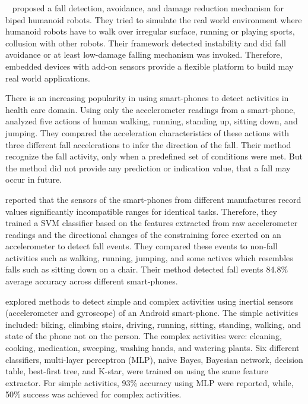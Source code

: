 \documentclass[letterpaper]{article}
\begin{document}
\begin{sloppy}
{~\cite{moya2014fall}} proposed a fall detection, avoidance, and damage 
reduction mechanism for biped humanoid robots. They tried to simulate the real world environment 
where humanoid robots have to walk over irregular surface, running or playing sports, collusion 
with other robots. Their framework detected instability and did fall avoidance or at 
least low-damage falling mechanism was invoked. Therefore, embedded devices  with add-on sensors 
provide a flexible platform to build may real world applications. 


There is an increasing popularity in using smart-phones to detect activities in health care domain. 
Using only the accelerometer readings from a smart-phone, \cite{bai2013recognition} analyzed five 
actions of human walking, running, standing up, sitting down, and jumping. They compared the 
acceleration characteristics of these actions with three different fall accelerations to infer the 
direction of the fall. Their method recognize the fall activity, only when a predefined set of 
conditions were met. But the method did not provide any prediction or indication value, that a fall 
may occur in future. 

\cite{steidl2012fall} reported that the sensors of the smart-phones from different manufactures 
record values significantly incompatible ranges for identical tasks. Therefore, they trained a SVM 
classifier based on the features extracted from raw accelerometer readings and the directional 
changes of the constraining force exerted on an accelerometer to detect fall events. They compared 
these events to non-fall activities such as walking, running, jumping, and some actives which 
resembles falls such as sitting down on a chair. Their method detected fall events 84.8\% average 
accuracy across different smart-phones. 

\cite{DernbachDKTC12} explored methods to detect simple and complex activities using inertial 
sensors (accelerometer and gyroscope) of an Android smart-phone. The simple activities included: 
biking, climbing stairs, driving, running, sitting, standing, walking, and state of the phone not 
on the person. The complex activities were: cleaning, cooking, medication, sweeping, washing hands, 
and watering plants. Six different classifiers, multi-layer  perceptron (MLP), na\"{i}ve  Bayes,  
Bayesian  network,  decision  table,  best-first tree, and  K-star,  were trained on using the same 
feature extractor. For simple activities, 93\% accuracy using MLP were reported, while, 50\% 
success was achieved for complex activities.    


\end{sloppy}
\end{document}

